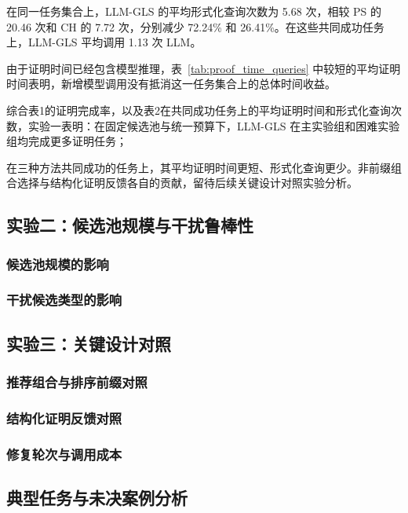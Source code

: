 在同一任务集合上，LLM-GLS 的平均形式化查询次数为 5.68 次，相较 PS 的 20.46 次和 CH 的 7.72 次，分别减少 72.24\% 和 26.41\%。在这些共同成功任务上，LLM-GLS 平均调用 1.13 次 LLM。

由于证明时间已经包含模型推理，表~\ref{tab:proof_time_queries} 中较短的平均证明时间表明，新增模型调用没有抵消这一任务集合上的总体时间收益。

综合表1的证明完成率，以及表2在共同成功任务上的平均证明时间和形式化查询次数，实验一表明：在固定候选池与统一预算下，LLM-GLS 在主实验组和困难实验组均完成更多证明任务；

在三种方法共同成功的任务上，其平均证明时间更短、形式化查询更少。非前缀组合选择与结构化证明反馈各自的贡献，留待后续关键设计对照实验分析。

\subsection{实验二：候选池规模与干扰鲁棒性}
\mbox{}\par
\subsubsection{候选池规模的影响}
\mbox{}\par
\subsubsection{干扰候选类型的影响}
\mbox{}\par
\subsection{实验三：关键设计对照}
\mbox{}\par
\subsubsection{推荐组合与排序前缀对照}
\mbox{}\par
\subsubsection{结构化证明反馈对照}
\mbox{}\par
\subsubsection{修复轮次与调用成本}
\mbox{}\par
\subsection{典型任务与未决案例分析}
\mbox{}\par
